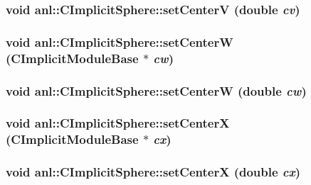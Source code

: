 \hypertarget{classanl_1_1CImplicitSphere_a136a294c116b255a2744618617080f68}{
\subsubsection[{setCenterV}]{\setlength{\rightskip}{0pt plus 5cm}void anl::CImplicitSphere::setCenterV (double {\em cv})}}
\label{classanl_1_1CImplicitSphere_a136a294c116b255a2744618617080f68}
\hypertarget{classanl_1_1CImplicitSphere_a089b5405d3eed1b5d80d7af0e671df59}{
\subsubsection[{setCenterW}]{\setlength{\rightskip}{0pt plus 5cm}void anl::CImplicitSphere::setCenterW ({\bf CImplicitModuleBase} $\ast$ {\em cw})}}
\label{classanl_1_1CImplicitSphere_a089b5405d3eed1b5d80d7af0e671df59}
\hypertarget{classanl_1_1CImplicitSphere_a79df7ce2dc6e08563c7b2da47959b837}{
\subsubsection[{setCenterW}]{\setlength{\rightskip}{0pt plus 5cm}void anl::CImplicitSphere::setCenterW (double {\em cw})}}
\label{classanl_1_1CImplicitSphere_a79df7ce2dc6e08563c7b2da47959b837}
\hypertarget{classanl_1_1CImplicitSphere_acf9a22d7ae341decfb5d0d861ee10f10}{
\subsubsection[{setCenterX}]{\setlength{\rightskip}{0pt plus 5cm}void anl::CImplicitSphere::setCenterX ({\bf CImplicitModuleBase} $\ast$ {\em cx})}}
\label{classanl_1_1CImplicitSphere_acf9a22d7ae341decfb5d0d861ee10f10}
\hypertarget{classanl_1_1CImplicitSphere_a8e7d41f51040ed8732e6015a5a02f206}{
\subsubsection[{setCenterX}]{\setlength{\rightskip}{0pt plus 5cm}void anl::CImplicitSphere::setCenterX (double {\em cx})}}

